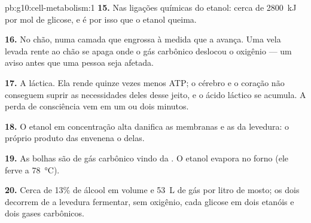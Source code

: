 \begin{solution}{pb:g10:cell-metabolism:1}
\textbf{15.} Nas ligações químicas do etanol: cerca de \qty{2800}{kJ}
por mol de glicose, e é por isso que o etanol queima.

\textbf{16.} No chão, numa camada que engrossa à medida que a
 avança. Uma vela levada rente ao chão se apaga onde o gás
carbônico deslocou o oxigênio --- um aviso antes que uma pessoa seja
afetada.

\textbf{17.} A  láctica. Ela rende quinze vezes menos ATP; o
cérebro e o coração não conseguem suprir as necessidades deles desse
jeito, e o ácido láctico se acumula. A perda de consciência vem em um
ou dois minutos.

\textbf{18.} O etanol em concentração alta danifica as membranas e as
 da levedura: o próprio produto das  envenena o
 delas.

\textbf{19.} As bolhas são de gás carbônico vindo da . O
etanol evapora no forno (ele ferve a \qty{78}{\celsius}).

\textbf{20.} Cerca de 13\% de álcool em volume e \qty{53}{L} de gás por
litro de mosto; os dois decorrem de a levedura fermentar, sem oxigênio,
cada glicose em dois etanóis e dois gases carbônicos.
\end{solution}
